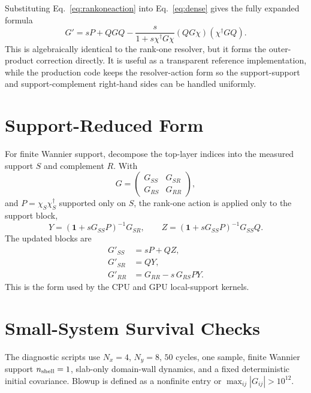 \documentclass[aps,prb,onecolumn,nofootinbib,superscriptaddress]{revtex4-2}
\newcommand{\Id}{\mathbf{1}}
\begin{document}
Substituting Eq.~\eqref{eq:rankoneaction} into Eq.~\eqref{eq:dense} gives the
fully expanded formula
\begin{equation}
    \boxed{
    G'
    =
    sP + QGQ
    -
    \frac{s}{1+s\chi^\dagger G\chi}
    (QG\chi)(\chi^\dagger GQ).
    }
    \label{eq:sherman}
\end{equation}
This is algebraically identical to the rank-one resolver, but it forms the
outer-product correction directly.  It is useful as a transparent reference
implementation, while the production code keeps the resolver-action form so the
support-support and support-complement right-hand sides can be handled uniformly.

\section{Support-Reduced Form}

For finite Wannier support, decompose the top-layer indices into the measured
support \(S\) and complement \(R\).  With
\begin{equation}
    G =
    \begin{pmatrix}
        G_{SS} & G_{SR}\\
        G_{RS} & G_{RR}
    \end{pmatrix},
\end{equation}
and \(P=\chi_S\chi_S^\dagger\) supported only on \(S\), the rank-one action is
applied only to the support block,
\begin{equation}
    Y=(\Id+sG_{SS}P)^{-1}G_{SR},\qquad
    Z=(\Id+sG_{SS}P)^{-1}G_{SS}Q.
\end{equation}
The updated blocks are
\begin{align}
    G'_{SS} &= sP + QZ,\\
    G'_{SR} &= QY,\\
    G'_{RR} &= G_{RR}-s\,G_{RS}PY.
\end{align}
This is the form used by the CPU and GPU local-support kernels.

\section{Small-System Survival Checks}

The diagnostic scripts use \(N_x=4\), \(N_y=8\), \(50\) cycles, one sample,
finite Wannier support \(n_{\rm shell}=1\), slab-only domain-wall dynamics, and
a fixed deterministic initial covariance.  Blowup is defined as a nonfinite
entry or \(\max_{ij}|G_{ij}|>10^{12}\).
\end{document}
